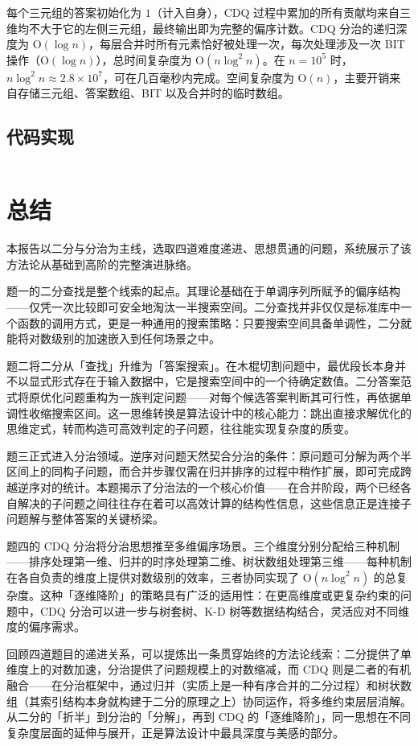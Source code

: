 \documentclass[12pt, a4paper]{academics}
\begin{document}
每个三元组的答案初始化为 $1$（计入自身），CDQ 过程中累加的所有贡献均来自三维均不大于它的左侧三元组，最终输出即为完整的偏序计数。CDQ 分治的递归深度为 $\mathrm{O}(\log n)$，每层合并时所有元素恰好被处理一次，每次处理涉及一次 BIT 操作（$\mathrm{O}(\log n)$），总时间复杂度为 $\mathrm{O}(n \log^2 n)$。在 $n = 10^5$ 时，$n \log^2 n \approx 2.8 \times 10^7$，可在几百毫秒内完成。空间复杂度为 $\mathrm{O}(n)$，主要开销来自存储三元组、答案数组、BIT 以及合并时的临时数组。

\subsection{代码实现}

\inputminted{c++}{../src/p4_cdq_3d.cpp}

\section{总结}

本报告以二分与分治为主线，选取四道难度递进、思想贯通的问题，系统展示了该方法论从基础到高阶的完整演进脉络。

题一的二分查找是整个线索的起点。其理论基础在于单调序列所赋予的偏序结构——仅凭一次比较即可安全地淘汰一半搜索空间。二分查找并非仅仅是标准库中一个函数的调用方式，更是一种通用的搜索策略：只要搜索空间具备单调性，二分就能将对数级别的加速嵌入到任何场景之中。

题二将二分从「查找」升维为「答案搜索」。在木棍切割问题中，最优段长本身并不以显式形式存在于输入数据中，它是搜索空间中的一个待确定数值。二分答案范式将原优化问题重构为一族判定问题——对每个候选答案判断其可行性，再依据单调性收缩搜索区间。这一思维转换是算法设计中的核心能力：跳出直接求解优化的思维定式，转而构造可高效判定的子问题，往往能实现复杂度的质变。

题三正式进入分治领域。逆序对问题天然契合分治的条件：原问题可分解为两个半区间上的同构子问题，而合并步骤仅需在归并排序的过程中稍作扩展，即可完成跨越逆序对的统计。本题揭示了分治法的一个核心价值——在合并阶段，两个已经各自解决的子问题之间往往存在着可以高效计算的结构性信息，这些信息正是连接子问题解与整体答案的关键桥梁。

题四的 CDQ 分治将分治思想推至多维偏序场景。三个维度分别分配给三种机制——排序处理第一维、归并的时序处理第二维、树状数组处理第三维——每种机制在各自负责的维度上提供对数级别的效率，三者协同实现了 $\mathrm{O}(n \log^2 n)$ 的总复杂度。这种「逐维降阶」的策略具有广泛的适用性：在更高维度或更复杂约束的问题中，CDQ 分治可以进一步与树套树、K-D 树等数据结构结合，灵活应对不同维度的偏序需求。

回顾四道题目的递进关系，可以提炼出一条贯穿始终的方法论线索：二分提供了单维度上的对数加速，分治提供了问题规模上的对数缩减，而 CDQ 则是二者的有机融合——在分治框架中，通过归并（实质上是一种有序合并的二分过程）和树状数组（其索引结构本身就构建于二分的原理之上）协同运作，将多维约束层层消解。从二分的「折半」到分治的「分解」，再到 CDQ 的「逐维降阶」，同一思想在不同复杂度层面的延伸与展开，正是算法设计中最具深度与美感的部分。
\end{document}
